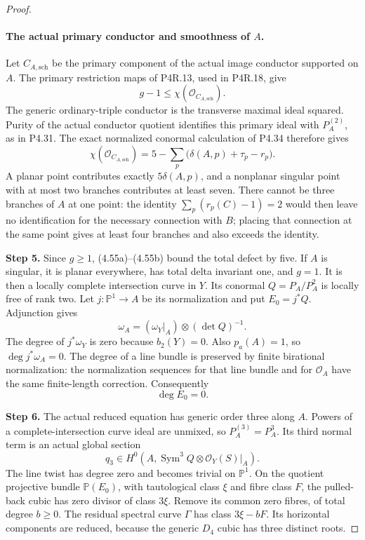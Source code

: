 \begin{proof}
\paragraph{The actual primary conductor and smoothness of $A$.}
Let $C_{A,\mathrm{sch}}$ be the primary component of the
actual image conductor supported on $A$. The primary
restriction maps of P4R.13, used in P4R.18, give
\[
                    g-1\le\chi(\mathcal O_{C_{A,\mathrm{sch}}}).
                                                            \tag{4.55a}
\]
The generic ordinary-triple conductor is the transverse
maximal ideal squared. Purity of the actual conductor
quotient identifies this primary ideal with $P_A^{(2)}$,
as in P4.31. The exact normalized conormal calculation of
P4.34 therefore gives
\[
 \chi(\mathcal O_{C_{A,\mathrm{sch}}})
       =5-\sum_p\bigl(\delta(A,p)+\tau_p-r_p\bigr).
                                                            \tag{4.55b}
\]
A planar point contributes exactly $5\delta(A,p)$, and a
nonplanar singular point with at most two branches contributes
at least seven. There cannot be three branches of $A$ at one
point: the identity
$\sum_p(r_p(C)-1)=2$ would then leave no identification for
the necessary connection with $B$; placing that connection
at the same point gives at least four branches and also
exceeds the identity.

\noindent\textbf{Step 5.} Since $g\ge1$, (4.55a)--(4.55b) bound the total defect by
five. If $A$ is singular, it is planar everywhere, has total
delta invariant one, and $g=1$. It is then a locally complete
intersection curve in $Y$. Its conormal
$Q=P_A/P_A^2$ is locally free of rank two. Let
$j:\mathbb P^1\to A$ be its normalization and put $E_0=j^*Q$.
Adjunction gives
\[
             \omega_A=(\omega_Y|_A)\otimes(\det Q)^{-1}.
\]
The degree of $j^*\omega_Y$ is zero because $b_2(Y)=0$.
Also $p_a(A)=1$, so $\deg j^*\omega_A=0$. The degree of a
line bundle is preserved by finite birational normalization:
the normalization sequences for that line bundle and for
$\mathcal O_A$ have the same finite-length correction.
Consequently
\[
                              \deg E_0=0.                 \tag{4.55c}
\]

\noindent\textbf{Step 6.} The actual reduced equation has generic order three along
$A$. Powers of a complete-intersection curve ideal are
unmixed, so $P_A^{(3)}=P_A^3$. Its third normal term is an
actual global section
\[
 q_3\in H^0\!\left(A,
          \operatorname{Sym}^3 Q\otimes\mathcal O_Y(S)|_A\right).
\]
The line twist has degree zero and becomes trivial on
$\mathbb P^1$. On the quotient projective bundle
$\mathbb P(E_0)$, with tautological class $\xi$ and fibre
class $F$, the pulled-back cubic has zero divisor of class
$3\xi$. Remove its common zero fibres, of total degree
$b\ge0$. The residual spectral curve $\Gamma$ has class
$3\xi-bF$. Its horizontal components are reduced, because
the generic $D_4$ cubic has three distinct roots.


\end{proof}
